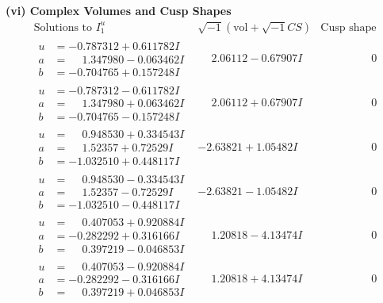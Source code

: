\documentclass[1p]{elsarticle_modified}
\theoremstyle{definition}
\newcommand{\I}{\sqrt{-1}}
\begin{document}
\newpage\flushleft \textbf{(vi) Complex Volumes and Cusp Shapes}
$$\begin{array}{c|c|c}  
\text{Solutions to }I^u_{1}& \I (\text{vol} + \sqrt{-1}CS) & \text{Cusp shape}\\
 \hline 
\begin{aligned}
u &= -0.787312 + 0.611782 I \\
a &= \phantom{-}1.347980 - 0.063462 I \\
b &= -0.704765 + 0.157248 I\end{aligned}
 & \phantom{-}2.06112 - 0.67907 I & \phantom{-0.000000 } 0 \\ \hline\begin{aligned}
u &= -0.787312 - 0.611782 I \\
a &= \phantom{-}1.347980 + 0.063462 I \\
b &= -0.704765 - 0.157248 I\end{aligned}
 & \phantom{-}2.06112 + 0.67907 I & \phantom{-0.000000 } 0 \\ \hline\begin{aligned}
u &= \phantom{-}0.948530 + 0.334543 I \\
a &= \phantom{-}1.52357 + 0.72529 I \\
b &= -1.032510 + 0.448117 I\end{aligned}
 & -2.63821 + 1.05482 I & \phantom{-0.000000 } 0 \\ \hline\begin{aligned}
u &= \phantom{-}0.948530 - 0.334543 I \\
a &= \phantom{-}1.52357 - 0.72529 I \\
b &= -1.032510 - 0.448117 I\end{aligned}
 & -2.63821 - 1.05482 I & \phantom{-0.000000 } 0 \\ \hline\begin{aligned}
u &= \phantom{-}0.407053 + 0.920884 I \\
a &= -0.282292 + 0.316166 I \\
b &= \phantom{-}0.397219 - 0.046853 I\end{aligned}
 & \phantom{-}1.20818 - 4.13474 I & \phantom{-0.000000 } 0 \\ \hline\begin{aligned}
u &= \phantom{-}0.407053 - 0.920884 I \\
a &= -0.282292 - 0.316166 I \\
b &= \phantom{-}0.397219 + 0.046853 I\end{aligned}
 & \phantom{-}1.20818 + 4.13474 I & \phantom{-0.000000 } 0 \\ \hline\begin{aligned}

\end{aligned}
\end{array}$$
\end{document}
